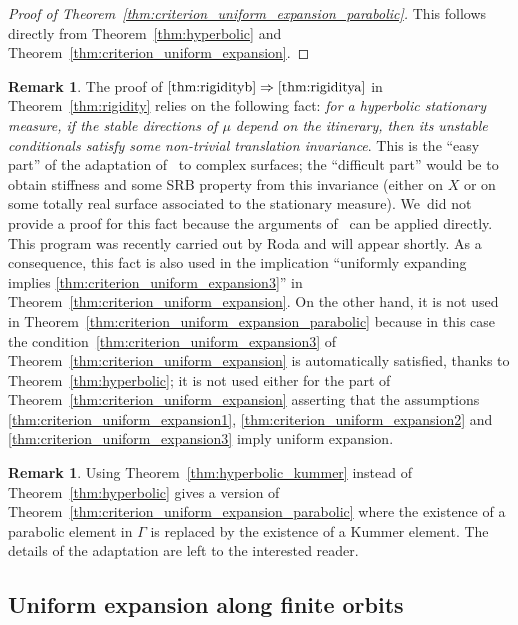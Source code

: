 \documentclass[JEP,XML,SOM,Unicode,published]{cedram}
\theoremstyle{plain}
\theoremstyle{definition}
\newtheorem{rem}[thm]{Remark}
\begin{document}
\begin{proof}[Proof of Theorem~\ref{thm:criterion_uniform_expansion_parabolic}]
This follows directly from Theorem~\ref{thm:hyperbolic} and Theorem~\ref{thm:criterion_uniform_expansion}.
\end{proof}

\begin{rem}\label{rmk:conditional}
The proof of $\eqref{thm:rigidityb}\Rightarrow\eqref{thm:rigiditya}$ in Theorem~\ref{thm:rigidity} relies on the following fact: {\textit{for a hyperbolic stationary measure, if the stable directions of $\mu$ depend on the itinerary, then its unstable conditionals satisfy some non-trivial translation invariance}}. This is the
``easy part'' of the adaptation of~\cite{br} to complex surfaces; the ``difficult part'' would be to obtain
stiffness and some SRB property from this invariance (either on $X$ or on some totally real surface associated to the stationary measure). We~did not provide a proof for this fact because the arguments of~\cite{br} can be applied directly. This program was recently carried out by Roda and will appear shortly.
As a consequence, this fact is also used in the implication ``uniformly expanding implies \eqref{thm:criterion_uniform_expansion3}'' in
Theorem~\ref{thm:criterion_uniform_expansion}. On the other hand, it is not used in Theorem~\ref{thm:criterion_uniform_expansion_parabolic} because in this case the condition~\eqref{thm:criterion_uniform_expansion3} of
Theorem~\ref{thm:criterion_uniform_expansion} is automatically
satisfied, thanks to Theorem~\ref{thm:hyperbolic}; it is not used either for the part of Theorem~\ref{thm:criterion_uniform_expansion} asserting that the assumptions \eqref{thm:criterion_uniform_expansion1}, \eqref{thm:criterion_uniform_expansion2} and \eqref{thm:criterion_uniform_expansion3} imply uniform expansion.
\end{rem}

\begin{rem}
Using Theorem~\ref{thm:hyperbolic_kummer} instead of Theorem~\ref{thm:hyperbolic} gives a version of
Theorem~\ref{thm:criterion_uniform_expansion_parabolic} where the existence of a parabolic element in $\Gamma$ is replaced by the existence of a Kummer element. The details of the adaptation are left to the interested reader.
\end{rem}

\subsection{Uniform expansion along finite orbits}\label{subs:finite_orbits}
\end{document}
